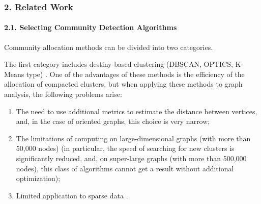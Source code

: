 \subsubsection{2. Related Work}

\paragraph{2.1. Selecting Community Detection Algorithms} Community allocation methods can be divided into two categories.

The first category includes destiny-based clustering (DBSCAN, OPTICS, K-Means type) \cite{EsterKriegelSander,KriegelKrogerSander,Lloyd}. One of the advantages of these methods is the efficiency of the allocation of compacted clusters, but when applying these methods to graph analysis, the following problems arise:

\begin{enumerate}
	\item The need to use additional metrics to estimate the distance between vertices, and, in the case of oriented graphs, this choice is very narrow;
	\item The limitations of computing on large-dimensional graphs (with more than 50,000 nodes) (in particular, the speed of searching for new clusters is significantly reduced, and, on super-large graphs (with more than 500,000 nodes), this class of algorithms cannot get a result without additional optimization);
	\item Limited application to sparse data \cite{BodrunovaOrekhovBlekanov}.
\end{enumerate}

